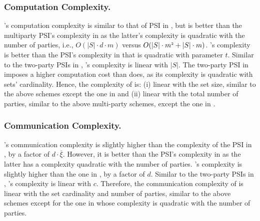 \subsubsection{Computation Complexity.} \epsi's computation complexity is similar to that of PSI in \cite{AbadiDMT22}, but is better than the multiparty PSI's complexity in \cite{DBLP:conf/ccs/KolesnikovMPRT17} as  the latter's complexity is quadratic with the number of parties, i.e., $O(|S|\cdot d\cdot m)$ versus $O(|S|\cdot m^{\scriptscriptstyle 2}+|S|\cdot m )$. \epsi's complexity  is better than the PSI's complexity in   \cite{NevoTY21}  that is quadratic with parameter $t$. Similar to the two-party PSIs in \cite{DebnathD16,RaghuramanR22}, \epsi's complexity is linear with $|S|$.  The two-party PSI in \cite{DBLP:conf/dbsec/DongCCR13} imposes a higher computation cost than \epsi does, as its complexity is quadratic with sets' cardinality. Hence, the complexity of \epsi is: (i) linear with the set size, similar to the above schemes except the one in \cite{DBLP:conf/dbsec/DongCCR13} and (ii) linear with the total number of parties, similar to  the above multi-party schemes, except the one in \cite{DBLP:conf/ccs/KolesnikovMPRT17}. 
%

\vspace{-3mm}
\subsubsection{Communication Complexity.}  \epsi's communication complexity is slightly higher than the complexity of the PSI in \cite{AbadiDMT22}, by a factor of $d\cdot \bar\xi$. However, it is better than the  PSI's complexity in \cite{DBLP:conf/ccs/KolesnikovMPRT17} as the latter has a complexity quadratic with the number of parties. \epsi's complexity is slightly higher than the one in \cite{NevoTY21}, by a factor of $d$. Similar to the two-party PSIs in  \cite{DebnathD16,RaghuramanR22,DBLP:conf/dbsec/DongCCR13}, \epsi's complexity is linear with $c$. 
%
Therefore, the communication complexity of \epsi is linear with the set cardinality and number of parties, similar to the above schemes except for the one in \cite{DBLP:conf/ccs/KolesnikovMPRT17} whose complexity is quadratic with the number of parties. 

